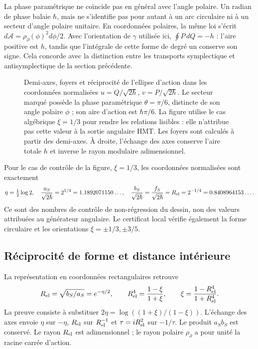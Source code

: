 La phase paramétrique ne coïncide pas en général avec l’angle polaire. Un radian
de phase balaie \(\hbar\), mais ne s’identifie pas pour autant à un arc
circulaire ni à un secteur d’angle polaire unitaire. En coordonnées polaires,
la même loi s’écrit
\(d\mathcal A=\rho_{\partial}(\phi)^2d\phi/2\).
Avec l’orientation de \(\gamma\) utilisée ici,
\(\oint P\,dQ=-h\) : l’aire positive est \(h\), tandis que
l’intégrale de cette forme de degré un conserve son signe. Cela concorde avec la
distinction entre les transports symplectique et antisymplectique de la
section précédente.

\begin{figure}[htbp]
 \centering
 
 \caption{Demi-axes, foyers et réciprocité de l'ellipse d'action dans les
 coordonnées normalisées \(u=Q/\sqrt{2\hbar}\),
 \(v=P/\sqrt{2\hbar}\). Le secteur marqué possède la phase paramétrique
 \(\theta=\pi/6\), distincte de son angle polaire \(\phi\) ; son aire
 d'action est \(\hbar\pi/6\). La figure utilise le cas algébrique
 \(\xi=1/3\) pour rendre les relations lisibles : elle n'attribue pas cette valeur
 à la sortie angulaire HMT. Les foyers sont calculés à partir des demi-axes.
 À droite, l'échange des axes conserve l'aire totale \(h\)
 et inverse le rayon modulaire adimensionnel.}
 \label{fig:ii-elipse-calculada}
\end{figure}

Pour le cas de contrôle de la figure, \(\xi=1/3\), les coordonnées
normalisées sont exactement
\[
 \eta=\tfrac12\log2,\quad
 \frac{a_S}{\sqrt{2\hbar}}=2^{1/4}=1.1892071150\ldots,\quad
 \frac{b_S}{\sqrt{2\hbar}}=
 \frac{f_S}{\sqrt{2\hbar}}=R_{\rm el}=2^{-1/4}=0.8408964153\ldots.
\]
Ce sont des nombres de contrôle de non-régression du dessin, non des valeurs attribuées au générateur
angulaire. Le certificat local vérifie également la forme circulaire et les
orientations \(\xi=\pm1/3,\pm3/5\).

\subsection{Réciprocité de forme et distance intérieure}

La représentation en coordonnées rectangulaires retrouve
\begin{equation}
 R_{\rm el}=\sqrt{b_S/a_S}=e^{-\eta/2},\qquad
 R_{\rm el}^4=\frac{1-\xi}{1+\xi},\qquad
 \xi=\frac{1-R_{\rm el}^4}{1+R_{\rm el}^4}.
 \label{eq:ii-elipse-reciproca}
\end{equation}
La preuve consiste à substituer
\(2\eta=\log((1+\xi)/(1-\xi))\). L'échange des axes
envoie \(\eta\) sur \(-\eta\), \(R_{\rm el}\) sur
\(R_{\rm el}^{-1}\) et \(\tau=iR_{\rm el}^2\) sur \(-1/\tau\).
Le produit \(a_Sb_S\) est conservé. Le rayon \(R_{\rm el}\) est adimensionnel ;
le rayon polaire \(\rho_{\partial}\) a pour unité la racine carrée d'action.

